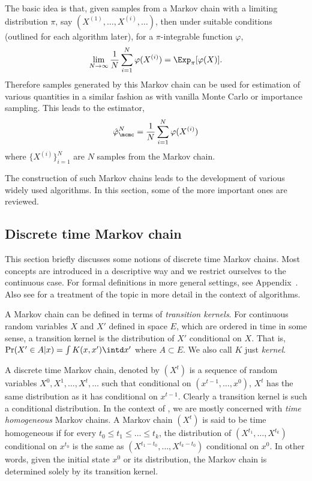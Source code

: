 The basic idea is that, given samples from a Markov chain with a limiting distribution $\pi$, say $(X^{(1)},\dots,X^{(i)},\dots)$, then under suitable conditions (outlined for each algorithm later), for a $\pi$-integrable function $\varphi$,
\begin{equation}
  \lim_{N\to\infty}\frac{1}{N}\sum_{i=1}^N\varphi(X^{(i)}) =
  \Exp_{\pi}[\varphi(X)].
  \label{eq:mcmc convergence}
\end{equation}
Therefore samples generated by this Markov chain can be used for estimation of various quantities in a similar fashion as with vanilla Monte Carlo or importance sampling. This leads to the estimator,
\begin{equation}
  \hat\varphi_{\mcmc}^N = \frac{1}{N}\sum_{i=1}^N\varphi(X^{(i)})
  \label{eq:mcmc est}
\end{equation}
where $\{X^{(i)}\}_{i=1}^N$ are $N$ samples from the Markov chain.

The construction of such Markov chains leads to the development of various widely used \mcmc algorithms. In this section, some of the more important ones are reviewed.

\subsection{Discrete time Markov chain}
\label{sub:Discrete time Markov chain}

This section briefly discusses some notions of discrete time Markov chains. Most concepts are introduced in a descriptive way and we restrict ourselves to the continuous case. For formal definitions in more general settings, see Appendix~. Also see \cite[][chap.~6]{Robert:2004tn} for a treatment of the topic in more detail in the context of \mcmc algorithms.

A Markov chain can be defined in terms of \emph{transition kernels}. For continuous random variables $X$ and $X'$ defined in space $E$, which are ordered in time in some sense, a transition kernel is the distribution of $X'$ conditional on $X$. That is, $\Pr(X'\in A|x) = \int K(x,x')\intd x'$ where $A\subset E$. We also call $K$ just \emph{kernel}.

A discrete time Markov chain, denoted by $(X^t)$ is a sequence of random variables $X^0,X^1,\dots,X^t,\dots$ such that conditional on $(x^{t-1},\dots,x^0)$, $X^t$ has the same distribution as it has conditional on $x^{t-1}$. Clearly a transition kernel is such a conditional distribution. In the context of \mcmc, we are mostly concerned with \emph{time homogeneous} Markov chains. A Markov chain $(X^t)$ is said to be time homogeneous if for every $t_0\le t_1\le\dots\le t_k$, the distribution of $(X^{t_1},\dots,X^{t_k})$ conditional on $x^{t_0}$ is the same as $(X^{t_1-t_0},\dots,X^{t_k-t_0})$ conditional on $x^0$. In other words, given the initial state $x^0$ or its distribution, the Markov chain is determined solely by its transition kernel.

